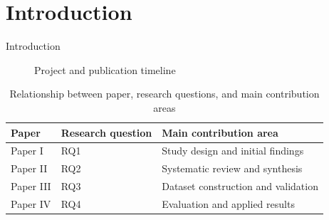 \chapter{Introduction}\label{sec:intro}
Introduction

\begin{figure}[htbp]
    \centering
    \caption{Project and publication timeline}
    \label{fig:project-publication-timeline}
\end{figure}

\begin{table}[htbp]
    \caption{Relationship between paper, research questions, and main contribution areas}
    \label{tab:publications-rqs-contributions}
    \centering
    \begin{tabular}{lll}
        \toprule
        Paper     & Research question & Main contribution area              \\
        \midrule
        Paper I   & RQ1               & Study design and initial findings   \\
        Paper II  & RQ2               & Systematic review and synthesis     \\
        Paper III & RQ3               & Dataset construction and validation \\
        Paper IV  & RQ4               & Evaluation and applied results      \\
        \bottomrule
    \end{tabular}
\end{table}
